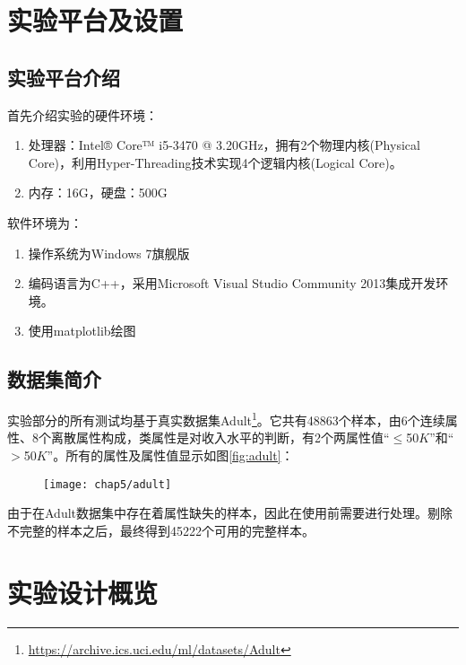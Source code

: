 \section{实验平台及设置}

\subsection{实验平台介绍}

首先介绍实验的硬件环境：
\begin{enumerate}
	\item 处理器：Intel® Core™ i5-3470 @ 3.20GHz，拥有2个物理内核(Physical Core)，利用Hyper-Threading技术实现4个逻辑内核(Logical Core)。
	\item 内存：16G，硬盘：500G
\end{enumerate}

软件环境为：
\begin{enumerate}
	\item 操作系统为Windows 7旗舰版
	\item 编码语言为C++，采用Microsoft Visual Studio Community 2013集成开发环境。
	\item 使用matplotlib绘图
\end{enumerate}

\subsection{数据集简介}

实验部分的所有测试均基于真实数据集Adult\footnote{\url{https://archive.ics.uci.edu/ml/datasets/Adult}}\cite{adult}。它共有48863个样本，由6个连续属性、8个离散属性构成，类属性是对收入水平的判断，有2个两属性值“$\leqslant$50$K$”和“$>$50$K$”。所有的属性及属性值显示如图\ref{fig:adult}：

\begin{figure}[!htp]
	\centering
	\texttt{[image: chap5/adult]}
\end{figure}

由于在Adult数据集中存在着属性缺失的样本，因此在使用前需要进行处理。剔除不完整的样本之后，最终得到45222个可用的完整样本。

\section{实验设计概览}

